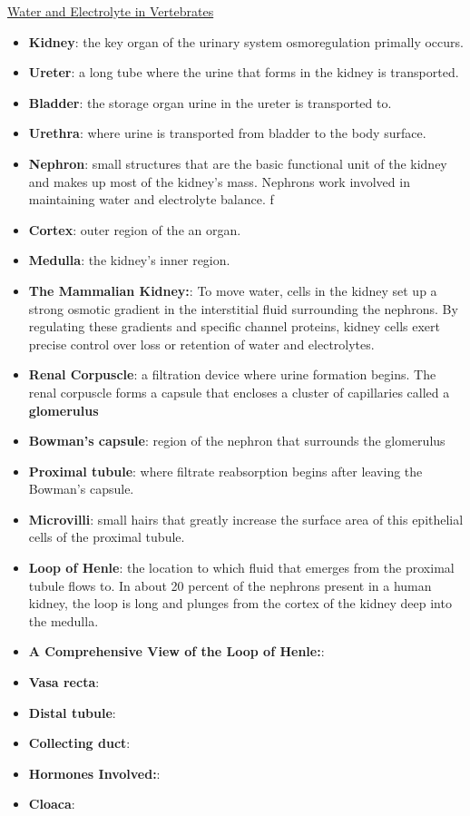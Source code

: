 \documentclass[12pt,letterpaper]{article}
\begin{document}
\hypertarget{40.5}{}
\begin{secbox}{\hyperlink{40}{Water and Electrolyte in Vertebrates}}{
    \begin{itemize}
        \item \textbf{Kidney}: the key organ of the urinary system osmoregulation primally occurs.
        \item \textbf{Ureter}: a long tube where the urine that forms in the kidney is transported.
        \item \textbf{Bladder}: the storage organ urine in the ureter is transported to. 
        \item \textbf{Urethra}: where urine is transported from bladder to the body surface.
        \item \textbf{Nephron}: small structures that are the basic functional unit of the
        kidney and makes up most of the kidney’s mass. Nephrons work involved in maintaining water and electrolyte balance.
        f\item \textbf{Cortex}: outer region of the an organ. 
        \item \textbf{Medulla}: the kidney’s inner region.
        \item \textbf{The Mammalian Kidney:}: To move water, cells in the kidney set up a strong osmotic gradient in the interstitial fluid surrounding the nephrons. By regulating these gradients and specific channel proteins, kidney cells exert precise control over loss or retention of water and electrolytes.
        \item \textbf{Renal Corpuscle}: a filtration device where urine formation begins. The renal corpuscle forms a capsule that encloses a cluster of capillaries called a \textbf{glomerulus}
        \item \textbf{Bowman's capsule}: region of the nephron that surrounds the glomerulus
        \item \textbf{Proximal tubule}: where filtrate reabsorption begins after leaving the Bowman's capsule. 
        \item \textbf{Microvilli}: small hairs that greatly increase the surface area of this epithelial cells of the proximal tubule.
        \item \textbf{Loop of Henle}: the location to which fluid that emerges from the proximal tubule flows to. In about 20 percent of the nephrons present in a human kidney, the loop is long and plunges from the cortex of the kidney deep into the medulla.
        \item \textbf{A Comprehensive View of the Loop of Henle:}:
        \item \textbf{Vasa recta}:
        \item \textbf{Distal tubule}:
        \item \textbf{Collecting duct}:
        \item \textbf{Hormones Involved:}:
        \item \textbf{Cloaca}:
    \end{itemize}
}\end{secbox}
\end{document}
